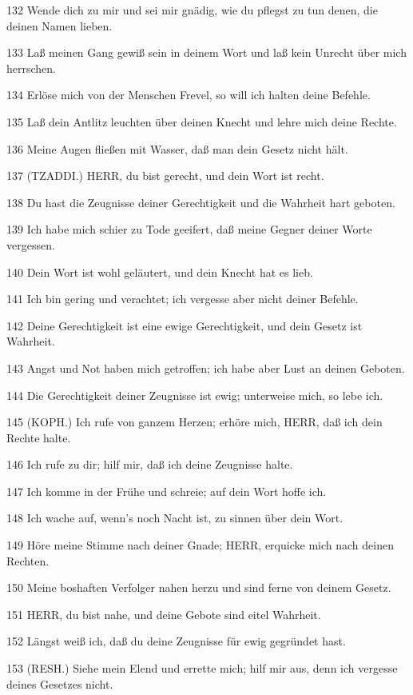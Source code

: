 \par 132 Wende dich zu mir und sei mir gnädig, wie du pflegst zu tun denen, die deinen Namen lieben.
\par 133 Laß meinen Gang gewiß sein in deinem Wort und laß kein Unrecht über mich herrschen.
\par 134 Erlöse mich von der Menschen Frevel, so will ich halten deine Befehle.
\par 135 Laß dein Antlitz leuchten über deinen Knecht und lehre mich deine Rechte.
\par 136 Meine Augen fließen mit Wasser, daß man dein Gesetz nicht hält.
\par 137 (TZADDI.) HERR, du bist gerecht, und dein Wort ist recht.
\par 138 Du hast die Zeugnisse deiner Gerechtigkeit und die Wahrheit hart geboten.
\par 139 Ich habe mich schier zu Tode geeifert, daß meine Gegner deiner Worte vergessen.
\par 140 Dein Wort ist wohl geläutert, und dein Knecht hat es lieb.
\par 141 Ich bin gering und verachtet; ich vergesse aber nicht deiner Befehle.
\par 142 Deine Gerechtigkeit ist eine ewige Gerechtigkeit, und dein Gesetz ist Wahrheit.
\par 143 Angst und Not haben mich getroffen; ich habe aber Lust an deinen Geboten.
\par 144 Die Gerechtigkeit deiner Zeugnisse ist ewig; unterweise mich, so lebe ich.
\par 145 (KOPH.) Ich rufe von ganzem Herzen; erhöre mich, HERR, daß ich dein Rechte halte.
\par 146 Ich rufe zu dir; hilf mir, daß ich deine Zeugnisse halte.
\par 147 Ich komme in der Frühe und schreie; auf dein Wort hoffe ich.
\par 148 Ich wache auf, wenn's noch Nacht ist, zu sinnen über dein Wort.
\par 149 Höre meine Stimme nach deiner Gnade; HERR, erquicke mich nach deinen Rechten.
\par 150 Meine boshaften Verfolger nahen herzu und sind ferne von deinem Gesetz.
\par 151 HERR, du bist nahe, und deine Gebote sind eitel Wahrheit.
\par 152 Längst weiß ich, daß du deine Zeugnisse für ewig gegründet hast.
\par 153 (RESH.) Siehe mein Elend und errette mich; hilf mir aus, denn ich vergesse deines Gesetzes nicht.
